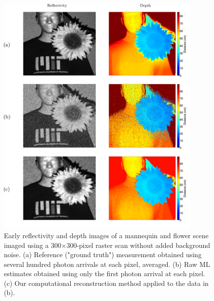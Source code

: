 \begin{figure}[h!]
\centerline{\includegraphics[width=0.9\textwidth]{figure-first-manflower.pdf}}
\caption{Early reflectivity and depth images of a mannequin and flower scene imaged using a 300$\times$300-pixel raster scan without added background noise. (a) Reference ("ground truth") measurement obtained using several hundred photon arrivals at each pixel, averaged. (b) Raw ML estimates obtained using only the first photon arrival at each pixel. (c) Our computational reconstruction method applied to the data in (b).}
\label{figure:first-manflower}
\end{figure}

